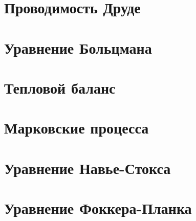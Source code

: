 





\section{Проводимость Друде}



\newpage
\section{Уравнение Больцмана}



\newpage
\section{Тепловой баланс}



\newpage
\section{Марковские процесса}



\newpage
\section{Уравнение Навье-Стокса}



\newpage
\section{Уравнение Фоккера-Планка}



% 







% 